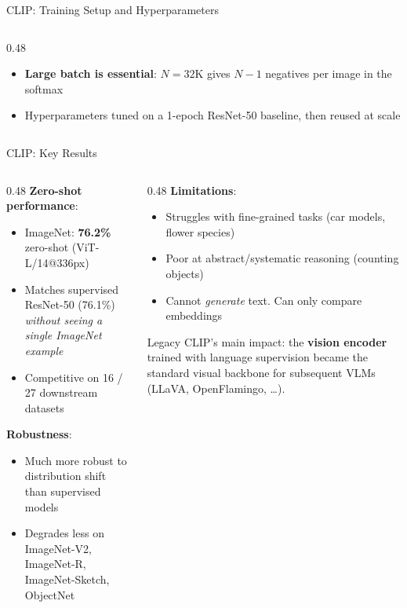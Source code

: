 \begin{frame}{CLIP: Training Setup and Hyperparameters}
\begin{columns}
\begin{column}{0.48\textwidth}
      \vspace{0.3em}
      \begin{itemize}
        \item \textbf{Large batch is essential}: $N{=}32$K gives $N{-}1$ negatives per image in the softmax
        \item Hyperparameters tuned on a 1-epoch ResNet-50 baseline, then reused at scale
      \end{itemize}
    \end{column}
  \end{columns}
\end{frame}

\begin{frame}{CLIP: Key Results}

  \begin{columns}
    \begin{column}{0.48\textwidth}
      \textbf{Zero-shot performance}:
      \begin{itemize}
        \item ImageNet: \textbf{76.2\%} zero-shot (ViT-L/14@336px)
        \item Matches supervised ResNet-50 (76.1\%) \emph{without seeing a single ImageNet example}
        \item Competitive on 16 / 27 downstream datasets
      \end{itemize}

      \vspace{0.3em}
      \textbf{Robustness}:
      \begin{itemize}
        \item Much more robust to distribution shift than supervised models
        \item Degrades less on ImageNet-V2, ImageNet-R, ImageNet-Sketch, ObjectNet
      \end{itemize}
    \end{column}
    \begin{column}{0.48\textwidth}
      \textbf{Limitations}:
      \begin{itemize}
        \item Struggles with fine-grained tasks (car models, flower species)
        \item Poor at abstract/systematic reasoning (counting objects)
        \item Cannot \emph{generate} text. Can only compare embeddings
      \end{itemize}

      \vspace{0.3em}
      \begin{block}{Legacy}
        CLIP's main impact: the \textbf{vision encoder} trained with language supervision became the standard visual backbone for subsequent VLMs (LLaVA, OpenFlamingo, \ldots).
      \end{block}
    \end{column}
  \end{columns}
\end{frame}


